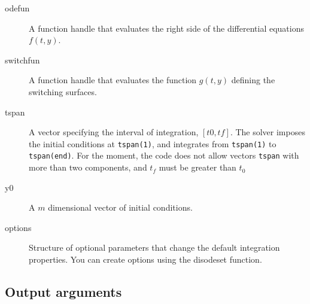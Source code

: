 \documentclass{article}
\begin{document}
\begin{description}
\item[odefun]
A function handle that evaluates the right side of the differential equations
$f(t,y)$.
\item[switchfun]
A function handle that evaluates the function $g(t,y)$ defining the switching
surfaces.
\item[tspan]
A vector specifying the interval of integration, $[t0,tf]$. The solver imposes the initial conditions at \texttt{tspan(1)},
and integrates from \texttt{tspan(1)} to \texttt{tspan(end)}.
For the moment, the code does not allow vectors \texttt{tspan} with more than two components, and $t_f$ must be greater than $t_0$
\item[y0]
A $m$ dimensional vector of initial conditions.
\item[options]
Structure of optional parameters that change the default integration properties.
You can create options using the disodeset function.
\end{description}

\subsection{Output arguments}
\end{document}
